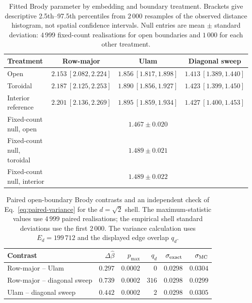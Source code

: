 \documentclass[final,1p,times,authoryear]{elsarticle}
\theoremstyle{definition}
\begin{document}
\begin{table}[t]
  \centering
  \caption{Fitted Brody parameter by embedding and boundary treatment.
           Brackets give descriptive 2.5th--97.5th percentiles from $2\,000$
           resamples of the observed distance histogram, not spatial confidence
           intervals. Null entries are mean $\pm$ standard deviation: $4\,999$
           fixed-count realisations for open boundaries and $1\,000$ for each
           other treatment.}
  \label{tab:local}
  \small
  \setlength{\tabcolsep}{4pt}
  \begin{tabular}{@{}lccc@{}}
    \toprule
    Treatment & Row-major & Ulam & Diagonal sweep \\
    \midrule
    Open & $2.153\ [2.082,2.224]$ & $1.856\ [1.817,1.898]$ & $1.413\ [1.389,1.440]$ \\
    Toroidal & $2.187\ [2.125,2.253]$ & $1.890\ [1.856,1.927]$ & $1.423\ [1.399,1.450]$ \\
    Interior reference & $2.201\ [2.136,2.269]$ & $1.895\ [1.859,1.934]$ & $1.427\ [1.400,1.453]$ \\
    \midrule
    Fixed-count null, open & \multicolumn{3}{c}{$1.467\pm0.020$} \\
    Fixed-count null, toroidal & \multicolumn{3}{c}{$1.489\pm0.021$} \\
    Fixed-count null, interior & \multicolumn{3}{c}{$1.489\pm0.022$} \\
    \bottomrule
  \end{tabular}
\end{table}

\begin{table}[t]
  \centering
  \caption{Paired open-boundary Brody contrasts and an independent check of
           Eq.~\eqref{eq:paired-variance} for the $d=\sqrt2$ shell. The
           maximum-statistic values use $4\,999$ paired realisations; the
           empirical shell standard deviations use the first $2\,000$. The
           variance calculation uses $E_d=199\,712$ and the displayed edge
           overlap $q_d$.}
  \label{tab:paired}
  \small
  \begin{tabular}{@{}lrrrrr@{}}
    \toprule
    Contrast & $\Delta\hat\beta$ & $p_{\max}$ & $q_d$ & $\sigma_{\rm exact}$ & $\sigma_{\rm MC}$ \\
    \midrule
    Row-major -- Ulam & $0.297$ & $0.0002$ & $0$ & $0.0298$ & $0.0304$ \\
    Row-major -- diagonal sweep & $0.739$ & $0.0002$ & $316$ & $0.0298$ & $0.0299$ \\
    Ulam -- diagonal sweep & $0.442$ & $0.0002$ & $2$ & $0.0298$ & $0.0305$ \\
    \bottomrule
  \end{tabular}
\end{table}
\end{document}
